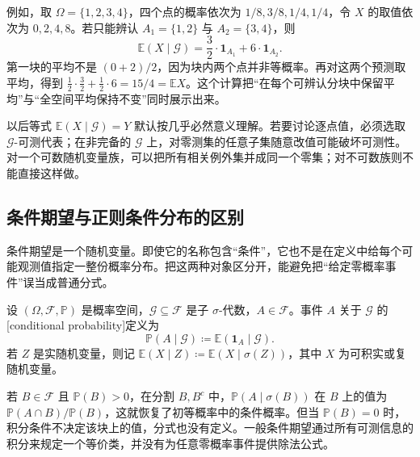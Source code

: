 例如，取 \(\Omega=\{1,2,3,4\}\)，四个点的概率依次为
\(1/8,3/8,1/4,1/4\)，令 \(X\) 的取值依次为 \(0,2,4,8\)。若只能辨认 \(A_1=\{1,2\}\) 与 \(A_2=\{3,4\}\)，则
\[
 \mathbb E(X\mid\mathcal G)
 =\frac32\cdot\mathbf1_{A_1}+6\cdot\mathbf1_{A_2}.
\]
第一块的平均不是 \((0+2)/2\)，因为块内两个点并非等概率。再对这两个预测取平均，得到
\(\frac12\cdot\frac32+\frac12\cdot6=15/4=\mathbb E X\)。这个计算把“在每个可辨认分块中保留平均”与“全空间平均保持不变”同时展示出来。

\ProseParagraphBreak

以后等式 \(\mathbb E(X\mid\mathcal G)=Y\) 默认按几乎必然意义理解。若要讨论逐点值，必须选取 \(\mathcal G\)-可测代表；在非完备的 \(\mathcal G\) 上，对零测集的任意子集随意改值可能破坏可测性。对一个可数随机变量族，可以把所有相关例外集并成同一个零集；对不可数族则不能直接这样做。

\subsection{条件期望与正则条件分布的区别}
\label{b1:subsec:310104}

条件期望是一个随机变量。即使它的名称包含“条件”，它也不是在定义中给每个可能观测值指定一整份概率分布。把这两种对象区分开，能避免把“给定零概率事件”误当成普通分式。

\begin{definition}\label{b1:def:conditional-probability-31}
设 \((\Omega,\mathcal F,\mathbb P)\) 是概率空间，\(\mathcal G\subseteq\mathcal F\) 是子 \(\sigma\)-代数，\(A\in\mathcal F\)。事件 \(A\) 关于 \(\mathcal G\) 的[conditional probability]定义为
\[
 \mathbb P(A\mid\mathcal G)\coloneqq
 \mathbb E(\mathbf1_A\mid\mathcal G).
\]
若 \(Z\) 是实随机变量，则记
\(\mathbb E(X\mid Z)\coloneqq\mathbb E(X\mid\sigma(Z))\)，其中 \(X\) 为可积实或复随机变量。
\end{definition}

若 \(B\in\mathcal F\) 且 \(\mathbb P(B)>0\)，在分割 \(B,B^c\) 中，\(\mathbb P(A\mid\sigma(B))\) 在 \(B\) 上的值为
\(\mathbb P(A\cap B)/\mathbb P(B)\)，这就恢复了初等概率中的条件概率。但当 \(\mathbb P(B)=0\) 时，积分条件不决定该块上的值，分式也没有定义。一般条件期望通过所有可测信息的积分来规定一个等价类，并没有为任意零概率事件提供除法公式。


